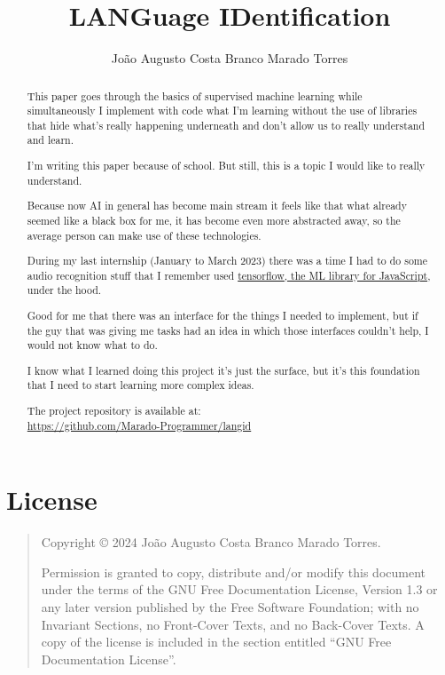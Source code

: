 \documentclass[a4paper,12pt]{article}
\title{LANGuage IDentification}
\author{João Augusto Costa Branco Marado Torres}
\newcommand{\copyrightnotice}{
    Copyright \copyright{}  2024  João Augusto Costa Branco Marado Torres.
}
\newcommand{\licensenotice}{
    \copyrightnotice
    Permission is granted to copy, distribute and/or modify this document
    under the terms of the GNU Free Documentation License, Version 1.3
    or any later version published by the Free Software Foundation;
    with no Invariant Sections, no Front-Cover Texts, and no Back-Cover Texts.
    A copy of the license is included in the section entitled ``GNU
    Free Documentation License''.
}
\theoremstyle{mytheoremstyle}
\theoremstyle{mytheoremstyle}
\theoremstyle{myproblemstyle}
\begin{document}
    \maketitle

    \begin{abstract}
        This paper goes through the basics of supervised machine learning while
        simultaneously I implement with code what I'm learning without the use
        of libraries that hide what's really happening underneath and don't
        allow us to really understand and learn.

        I'm writing this paper because of school. But still, this is a topic I
        would like to really understand.

        Because now AI in general has become main stream it feels like that
        what already seemed like a black box for me, it has become even more
        abstracted away, so the average person can make use of these
        technologies.

        During my last internship (January to March 2023) there was a time I
        had to do some audio recognition stuff that I remember used
        \href{https://www.tensorflow.org/js}{tensorflow, the ML library for
        JavaScript}, under the hood.

        Good for me that there was an interface for the things I needed to
        implement, but if the guy that was giving me tasks had an idea in which
        those interfaces couldn't help, I would not know what to do.

        I know what I learned doing this project it's just the surface, but
        it's this foundation that I need to start learning more complex ideas.

        The project repository is available at: \\
        \url{https://github.com/Marado-Programmer/langid} \cite{repo}
    \end{abstract}

    \section*{License}

    \bigskip
    \begin{quote}
        \licensenotice
    \end{quote}
    \bigskip

    \tableofcontents

\end{document}
